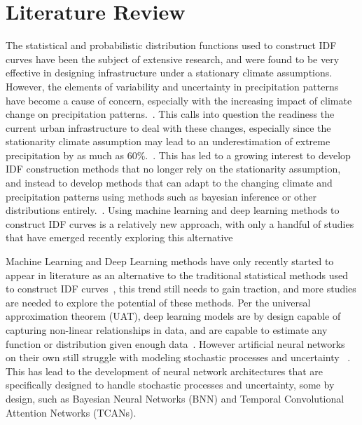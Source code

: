 \section{Literature Review}
The statistical and probabilistic distribution functions used to construct IDF curves have been the subject of extensive research, and were found to be very effective in designing infrastructure under a stationary climate assumptions. However, the elements of variability and uncertainty in precipitation patterns have become a cause of concern, especially with the increasing impact of climate change on precipitation patterns.~\cite{Cheng2014}. This calls into question the readiness the current urban infrastructure to deal with these changes, especially since the stationarity climate assumption may lead to an underestimation of extreme precipitation by as much as 60\%.~\cite{Cheng2014}. This has led to a growing interest to develop IDF construction methods that no longer rely on the stationarity assumption, and instead to develop methods that can adapt to the changing climate and precipitation patterns using methods such as bayesian inference or other distributions entirely.~\cite{Cheng2014}\cite{hess-2020-173}\cite{hess-27-2075-2023}\cite{hess-25-6133-2021}. Using machine learning and deep learning methods to construct IDF curves is a relatively new approach, with only a handful of studies that have emerged recently exploring this alternative~\cite{idfkoya}

\vspace{1em}

Machine Learning and Deep Learning methods have only recently started to appear in literature as an alternative to the traditional statistical methods used to construct IDF curves~\cite{idfkoya}, this trend still needs to gain traction, and more studies are needed to explore the potential of these methods. Per the universal approximation theorem (UAT), deep learning models are by design capable of capturing non-linear relationships in data, and are capable to estimate any function or distribution given enough data~\cite{Goodfellow2016-sect6.4.1}. However artificial neural networks on their own still struggle with modeling stochastic processes and uncertainty ~\cite{}. This has lead to the development of neural network architectures that are specifically designed to handle stochastic processes and uncertainty, some by design, such as Bayesian Neural Networks (BNN) and Temporal Convolutional Attention Networks (TCANs).~\cite{} 

\vspace{1em}

